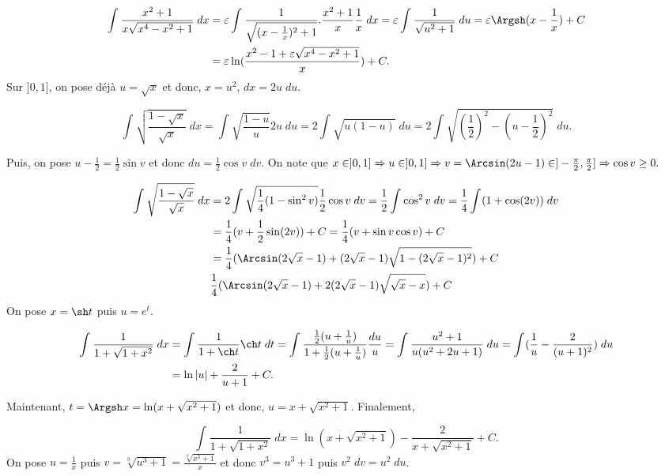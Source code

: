 {{\begin{align*}\ensuremath
\int_{}^{}\frac{x^2+1}{x\sqrt{x^4-x^2+1}}\;dx&=\varepsilon\int_{}^{}\frac{1}{\sqrt{(x-\frac{1}{x})^2+1}}.\frac{x^2+1}{x}\frac{1}{x}\;dx
=\varepsilon\int_{}^{}\frac{1}{\sqrt{u^2+1}}\;du=\varepsilon\Argsh(x-\frac{1}{x})+C\\
 &=\varepsilon\ln(\frac{x^2-1+\varepsilon\sqrt{x^4-x^2+1}}{x})+C.
\end{align*}
Sur $]0,1]$, on pose déjà $u=\sqrt{x}$ et donc, $x=u^2$, $dx=2u\;du$.

$$\int_{}^{}\sqrt{\frac{1-\sqrt{x}}{\sqrt{x}}}\;dx=\int_{}^{}\sqrt{\frac{1-u}{u}}2u\;du=2\int_{}^{}\sqrt{u(1-u)}\;du
=2\int_{}^{}\sqrt{(\frac{1}{2})^2-(u-\frac{1}{2})^2}\;du.$$

Puis, on pose $u-\frac{1}{2}=\frac{1}{2}\sin v$ et donc $du=\frac{1}{2}\cos v\;dv$. 
On note que $x\in]0,1]\Rightarrow u\in]0,1]\Rightarrow v=\Arcsin(2u-1)\in]-\frac{\pi}{2},\frac{\pi}{2}]\Rightarrow\cos v\geq0.$

\begin{align*}\ensuremath
\int_{}^{}\sqrt{\frac{1-\sqrt{x}}{\sqrt{x}}}\;dx&=2\int_{}^{}\sqrt{\frac{1}{4}(1-\sin^2v)}\frac{1}{2}\cos v\;dv
=\frac{1}{2}\int_{}^{}\cos^2v\;dv=\frac{1}{4}\int_{}^{}(1+\cos(2v))\;dv\\
 &=\frac{1}{4}(v+\frac{1}{2}\sin(2v))+C=\frac{1}{4}(v+\sin v\cos v)+C\\
 &=\frac{1}{4}(\Arcsin(2\sqrt{x}-1)+(2\sqrt{x}-1)\sqrt{1-(2\sqrt{x}-1)^2})+C\\
 &\frac{1}{4}(\Arcsin(2\sqrt{x}-1)+2(2\sqrt{x}-1)\sqrt{\sqrt{x}-x})+C
\end{align*}
On pose $x=\sh t$ puis $u=e^t$.

\begin{align*}\ensuremath
\int_{}^{}\frac{1}{1+\sqrt{1+x^2}}\;dx&=\int_{}^{}\frac{1}{1+\ch t}\ch t\;dt=\int_{}^{}\frac{\frac{1}{2}(u+\frac{1}{u})}{1+\frac{1}{2}(u+\frac{1}{u})}\frac{du}{u}
=\int_{}^{}\frac{u^2+1}{u(u^2+2u+1)}\;du=\int_{}^{}(\frac{1}{u}-\frac{2}{(u+1)^2})\;du\\
 &=\ln|u|+\frac{2}{u+1}+C.
\end{align*}

Maintenant, $t=\Argsh x=\ln(x+\sqrt{x^2+1})$ et donc, $u=x+\sqrt{x^2+1}$. Finalement,

$$\int_{}^{}\frac{1}{1+\sqrt{1+x^2}}\;dx=\ln(x+\sqrt{x^2+1})-\frac{2}{x+\sqrt{x^2+1}}+C.$$
On pose $u=\frac{1}{x}$ puis $v=\sqrt[3]{u^3+1}=\frac{\sqrt[3]{x^3+1}}{x}$ et donc $v^3=u^3+1$ puis $v^2\;dv=u^2\;du$.

}}
